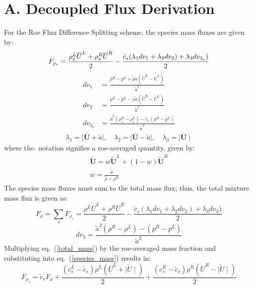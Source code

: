 \documentclass[]{aiaa-tc}%
\begin{document}
\section*{A. Decoupled Flux Derivation}

For the Roe Flux Difference Splitting scheme, the species mass fluxes are given by:
%
\begin{equation}
	F_{\rho_s} = \frac{\rho_s^L\overline{U}^L+\rho_s^R\overline{U}^R}{2}
	-\frac{\tilde{c}_s(\lambda_1 dv_1 + \lambda_2 dv_2)+\lambda_3 dv_{3_s})}{2} \label{species_mass} \\
\end{equation}
\begin{align}	
		dv_1 &= \frac{p^R-p^L+\tilde{\rho} \tilde{a} (\overline{U}^R-\overline{U}^L)}{\tilde{a}^2} \\
		dv_2 &= \frac{p^R-p^L-\tilde{\rho} \tilde{a} (\overline{U}^R-\overline{U}^L)}{\tilde{a}^2} \\
		dv_{3_s} &= \frac{\tilde{a}^2 (\rho_s^R-\rho_s^L)- \tilde{c}_s (p^R-p^L)}{\tilde{a}^2}
\end{align}
\begin{align}
	\lambda_1 = \mid\mathbf{\overline{U}}+\tilde{a} \mid,\quad 
	\lambda_2 = \mid \mathbf{\overline{U}}-\tilde{a} \mid,\quad 
	\lambda_3 =  \mid \mathbf{\overline{U}} \mid
\end{align}
%
where the $\tilde{}$ notation signifies a roe-averaged quantity, given by:
%
\begin{gather}
	\mathbf{\tilde{U}} =w\mathbf{\tilde{U}}^L+(1-w)\mathbf{\tilde{U}}^R \\
	w = \frac{\tilde{\rho}}{\tilde{\rho}+\rho^R}
\end{gather}
%
The species mass fluxes must sum to the total mass flux; thus, the total mixture mass flux is given as:
%
\begin{equation}
\label{total_mass}
	F_\rho = \sum\limits_{s}{F_{\rho_s}} = \frac{\rho^L\overline{U}^L+\rho^R\overline{U}^R}{2}
	-\frac{\tilde{c}_s(\lambda_1 dv_1 + \lambda_2 dv_2)+\lambda_3 dv_3)}{2}
\end{equation}
\begin{equation}
	dv_3 = \frac{\tilde{a}^2 (\rho^R-\rho^L)-(p^R-p^L)}{\tilde{a}^2}
\end{equation}
%
Multiplying eq.~(\ref{total_mass}) by the roe-averaged mass fraction and substituting into eq.~(\ref{species_mass}) results in:
%
\begin{equation}
\label{unsimp_sp_flux}
	F_{\rho_s} =\tilde{c}_s F_\rho + \frac{(c_s^L-\tilde{c}_s)\rho^L(\overline{U}^L+\mid \tilde{U}\mid)}{2}
	+ \frac{(c_s^R-\tilde{c}_s)\rho^R(\overline{U}^R-\mid \tilde{U}\mid)}{2}
\end{equation}
\end{document}
